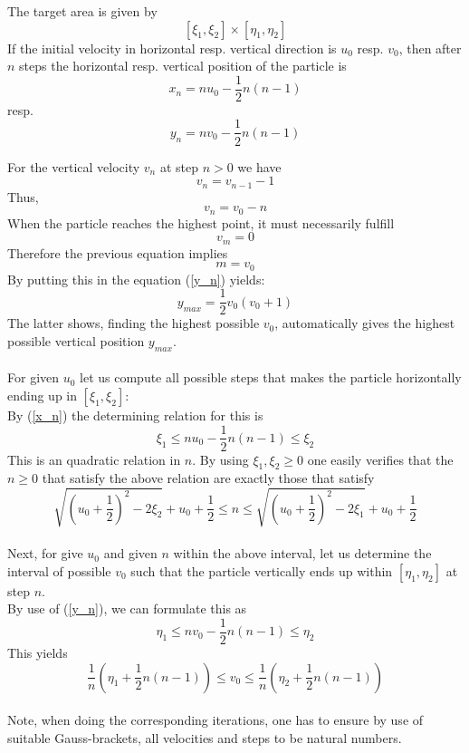 \documentclass[17pt]{extarticle}
\begin{document}
The target area is given by
$$[\xi_1, \xi_2]\times [\eta_1, \eta_2]$$
If the initial velocity in horizontal resp. vertical direction is $u_0$ resp. $v_0$, then
after $n$ steps the horizontal resp. vertical position of the particle is
\begin{equation} \label{x_n}
x_n=n u_0-\frac{1}{2}n(n-1)
\end{equation}
resp.
\begin{equation} \label{y_n}
y_n=n v_0-\frac{1}{2}n(n-1)
\end{equation}
 
 For the vertical velocity $v_n$ at step $n>0$ we have
 $$v_n=v_{n-1}-1$$
 Thus,
 $$v_n=v_0-n$$
 When the particle reaches the highest point, it must necessarily fulfill
 $$v_m=0$$
 Therefore the previous equation implies
 $$m=v_0$$
 By putting this in the equation (\ref{y_n}) yields:
 $$y_{max}=\frac{1}{2}v_0(v_0+1)$$
 The latter shows, finding the highest possible $v_0$, automatically gives the highest possible
 vertical position $y_{max}$.\\ \\
 For given $u_0$ let us compute all possible steps that makes the particle horizontally ending up in $[\xi_1, \xi_2]$:\\
 By (\ref{x_n}) the determining relation for this is
 $$\xi_1\leq n u_0-\frac{1}{2}n(n-1)\leq \xi_2$$
 This is an quadratic relation in $n$. By using $\xi_1, \xi_2\geq 0$ one easily verifies 
 that the $n\geq 0$ that satisfy the above relation are exactly those that satisfy
 $$\sqrt{\left(u_0+\frac{1}{2}\right)^2-2\xi_2}+u_0+\frac{1}{2}\leq n\leq \sqrt{\left(u_0+\frac{1}{2}\right)^2-2\xi_1}+u_0+\frac{1}{2}$$
 \\
 Next, for give $u_0$ and given $n$ within the above interval, let us determine the interval of possible $v_0$ such that the particle vertically ends up within $[\eta_1, \eta_2]$ at step $n$.\\
 By use of (\ref{y_n}), we can formulate this as
 $$\eta_1\leq nv_0-\frac{1}{2}n(n-1)\leq \eta_2$$
 This yields
 $$\frac{1}{n}\left(\eta_1+\frac{1}{2}n(n-1)\right)\leq v_0 \leq \frac{1}{n}\left(\eta_2+\frac{1}{2}n(n-1)\right)$$
 \\
 Note, when doing the corresponding iterations, one has to ensure by use of suitable Gauss-brackets, all velocities and steps to be natural numbers. 
\end{document}
